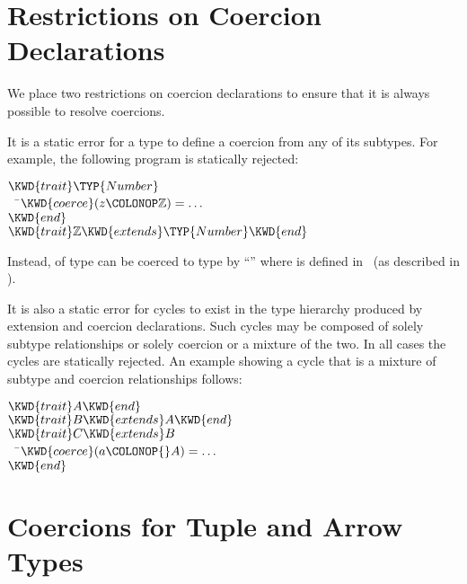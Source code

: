 \section{Restrictions on Coercion Declarations}
We place two restrictions on coercion declarations to ensure that it is
always possible to resolve coercions.

It is a static error for a type to define a coercion from any of its
subtypes.  For example, the following program is statically rejected:

\begin{Fortress}
\(\KWD{trait} \TYP{Number}\)\\
{\tt~~}\pushtabs\=\+\(  \KWD{coerce}(z\COLONOP\mathbb{Z}) = \ldots\)\-\\\poptabs
\(\KWD{end}\)\\[4pt]
\(\KWD{trait} \mathbb{Z} \KWD{extends} \TYP{Number} \KWD{end}\)
\end{Fortress}
Instead,  of type  can be coerced to type
 by
``''
where  is defined in \library\
(as described in ).


It is also a static error for cycles to exist in the type hierarchy
produced by extension and coercion declarations.  Such cycles may be
composed of solely subtype relationships or solely coercion or a
mixture of the two.  In all cases the cycles are statically rejected.
An example showing a cycle that is a mixture of subtype and coercion
relationships follows:


\begin{Fortress}
\(\KWD{trait} A \KWD{end} \)\\[4pt]
\(\KWD{trait} B \KWD{extends} A \KWD{end}\)\\[4pt]
\(\KWD{trait} C \KWD{extends} B\)\\
{\tt~~}\pushtabs\=\+\(  \KWD{coerce}(a\COLONOP{}A) = \ldots\)\-\\\poptabs
\(\KWD{end}\)
\end{Fortress}



\section{Coercions for Tuple and Arrow Types}

